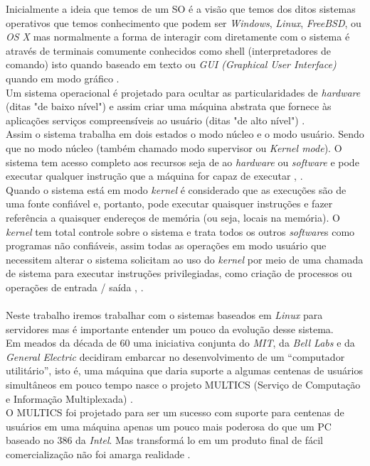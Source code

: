 Inicialmente a ideia que temos de um SO é a visão que temos dos ditos sistemas operativos que temos conhecimento que podem ser \emph{Windows}, \emph{Linux}, \emph{FreeBSD}, ou \emph{OS X} mas normalmente a forma de interagir com diretamente com o sistema é através de terminais comumente conhecidos como shell (interpretadores de comando) isto quando baseado em texto ou \emph{GUI (Graphical User Interface)} quando em modo gráfico \cite{Tanenbaum2016}.\\
Um sistema operacional é projetado para ocultar as particularidades de \emph{hardware} (ditas "de baixo nível") e assim criar uma máquina abstrata que fornece às aplicações serviços compreensíveis ao usuário (ditas "de alto nível") \cite{Comer2012}.\\
Assim o sistema trabalha em dois estados o modo núcleo e o modo usuário. Sendo que no modo núcleo (também chamado modo supervisor ou \emph{Kernel mode}). O sistema tem acesso completo aos recursos seja de ao \emph{hardware} ou \emph{software} e pode executar qualquer instrução que a máquina for capaz de executar \cite{Tanenbaum2016}, \cite{linfo2007}.\\
Quando o sistema está em modo \emph{kernel} é considerado que as execuções são de uma fonte confiável e, portanto, pode executar quaisquer instruções e fazer referência a quaisquer endereços de memória (ou seja, locais na memória). O \emph{kernel} tem total controle sobre o sistema e trata todos os outros \emph{software}s como programas não confiáveis, assim todas as operações em modo usuário que necessitem alterar o sistema solicitam ao uso do \emph{kernel} por meio de uma chamada de sistema  para executar instruções privilegiadas, como criação de processos ou operações de entrada / saída \cite{Tanenbaum2016}, \cite{linfo2007}.\\
\\Neste trabalho iremos trabalhar com o sistemas baseados em \emph{Linux} para servidores mas é importante entender um pouco da evolução desse sistema.\\
Em meados da década de 60 uma iniciativa conjunta do \emph{MIT}, da \emph{Bell Labs}  e da \emph{General Electric} decidiram embarcar no desenvolvimento de um “computador utilitário”, isto é, uma máquina que daria suporte a algumas centenas de usuários simultâneos em pouco tempo nasce o projeto MULTICS (Serviço de Computação e Informação Multiplexada) \cite{Tanenbaum2016}.\\
O MULTICS foi projetado para ser um sucesso com suporte para centenas de usuários em uma máquina apenas um pouco mais poderosa do que um PC baseado no 386 da \emph{Intel}. Mas transformá lo em um produto final de fácil comercialização não foi amarga realidade \cite{Tanenbaum2016}.\\
